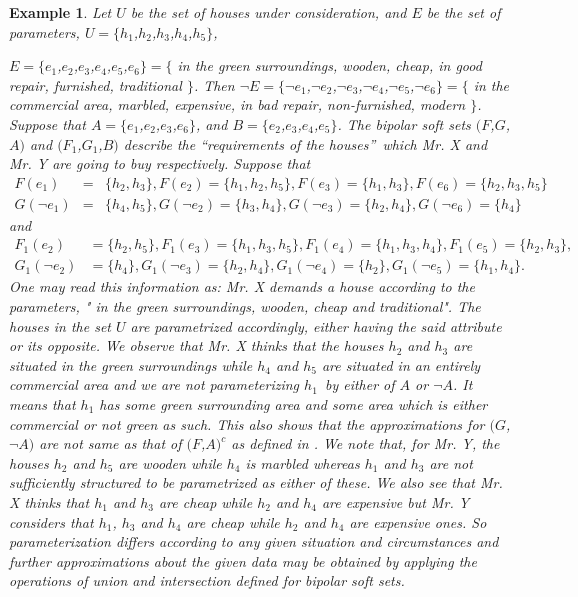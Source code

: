 \documentclass{amsart}
\theoremstyle{plain}
\newtheorem{example}{Example}
\numberwithin{equation}{section}
\begin{document}
\begin{example}
Let $U$ be the set of houses under consideration, and $E$ be the set of
parameters, $U=\{h_{1}$,$h_{2}$,$h_{3}$,$h_{4}$,$h_{5}\}$,

$E=\{e_{1}$,$e_{2}$,$e_{3}$,$e_{4}$,$e_{5}$,$e_{6}\}=\{$ in the green
surroundings, wooden, cheap, in good repair, furnished, traditional $\}$.
Then $\lnot E=\{\lnot e_{1}$,$\lnot e_{2}$,$\lnot e_{3}$,$\lnot e_{4}$,$\lnot e_{5}$,$\lnot e_{6}\}=\{$ in the commercial area, marbled, expensive,
in bad repair, non-furnished, modern $\}$. Suppose that $A=\{e_{1}$,$e_{2}$,$e_{3}$,$e_{6}\}$, and $B=\{e_{2}$,$e_{3}$,$e_{4}$,$e_{5}\}$. The bipolar
soft sets $(F$,$G$,$A)$ and $(F_{1}$,$G_{1}$,$B)$ describe the
\textquotedblleft requirements of the houses\textquotedblright\ which Mr. X
and Mr. Y are going to buy respectively. Suppose that\begin{eqnarray*}
F(e_{1})
&=&\{h_{2},h_{3}\},F(e_{2})=\{h_{1},h_{2},h_{5}\},F(e_{3})=\{h_{1},h_{3}\},F(e_{6})=\{h_{2},h_{3},h_{5}\} \\
G(\lnot e_{1}) &=&\{h_{4},h_{5}\},G(\lnot e_{2})=\{h_{3},h_{4}\},G(\lnot
e_{3})=\{h_{2},h_{4}\},G(\lnot e_{6})=\{h_{4}\}
\end{eqnarray*}and\begin{align*}
F_{1}(e_{2})&
=\{h_{2},h_{5}\},F_{1}(e_{3})=\{h_{1},h_{3},h_{5}\},F_{1}(e_{4})=\{h_{1},h_{3},h_{4}\},F_{1}(e_{5})=\{h_{2},h_{3}\}, \\
G_{1}(\lnot e_{2})& =\{h_{4}\},G_{1}(\lnot
e_{3})=\{h_{2},h_{4}\},G_{1}(\lnot e_{4})=\{h_{2}\},G_{1}(\lnot
e_{5})=\{h_{1},h_{4}\}.
\end{align*}One may read this information as: Mr. X demands a house according to the
parameters, " in the green surroundings, wooden, cheap and traditional". The
houses in the set $U$ are parametrized accordingly, either having the said
attribute or its opposite. We observe that Mr. X thinks that the houses $h_{2}$ and $h_{3}$ are situated in the green surroundings while $h_{4}$ and $h_{5}$ are situated in an entirely commercial area and we are not
parameterizing $h_{1}$\ by either of $A$ or $\lnot A$. It means that $h_{1}$
has some green surrounding area and some area which is either commercial or
not green as such. This also shows that the approximations for $(G$,$\lnot A)
$ are not same as that of $(F$,$A)^{c}$ as defined in \cite{[2]}. We note
that, for Mr. Y, the houses $h_{2}$ and $h_{5}$ are wooden while $h_{4}$ is
marbled whereas $h_{1}$ and $h_{3}$ are not sufficiently structured to be
parametrized as either of these. We also see that Mr. X thinks that $h_{1}$
and $h_{3}$ are cheap while $h_{2}$ and $h_{4}$ are expensive but Mr. Y
considers that $h_{1}$, $h_{3}$ and $h_{4}$ are cheap while $h_{2}$ and $h_{4}$ are expensive ones. So parameterization differs according to any
given situation and circumstances and further approximations about the given
data may be obtained by applying the operations of union and intersection
defined for bipolar soft sets.


\end{example}
\end{document}
